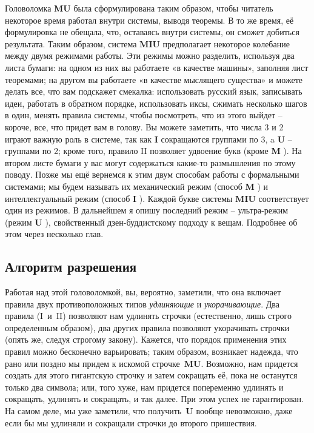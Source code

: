 \documentclass[../main.tex]{subfiles}
\begin{document}
Головоломка \textbf{MU} была сформулирована таким образом, чтобы читатель некоторое время работал внутри системы, выводя теоремы. В то же время, её формулировка не обещала, что, оставаясь внутри системы, он сможет добиться результата. Таким образом, система \textbf{MIU} предполагает некоторое колебание между двумя режимами работы. Эти режимы можно разделить, используя два листа бумаги: на одном из них вы работаете «в качестве машины», заполняя лист теоремами; на другом вы работаете «в качестве мыслящего существа» и можете делать все, что вам подскажет смекалка: использовать русский язык, записывать идеи, работать в обратном порядке, использовать иксы, сжимать несколько шагов в один, менять правила системы, чтобы посмотреть, что из этого выйдет \--- короче, все, что придет вам в голову. Вы можете заметить, что числа 3 и 2 играют важную роль в системе, так как \textbf{I} сокращаются группами по 3, a \textbf{U} \--- группами по 2; кроме того, правило II позволяет удвоение букв (кроме \textbf{M} ). На втором листе бумаги у вас могут содержаться какие-то размышления по этому поводу. Позже мы ещё вернемся к этим двум способам работы с формальными системами; мы будем называть их механический режим (способ \textbf{M} ) и интеллектуальный режим (способ \textbf{I} ). Каждой букве системы \textbf{MIU} соответствует один из режимов. В дальнейшем я опишу последний режим \--- ультра-режим (режим \textbf{U} ), свойственный дзен-буддистскому подходу к вещам. Подробнее об этом через несколько глав.


\subsection{Алгоритм разрешения}

Работая над этой головоломкой, вы, вероятно, заметили, что она включает правила двух противоположных типов \emph{удлиняющие} и \emph{укорачивающие}. Два правила (I~и~II) позволяют нам удлинять строчки (естественно, лишь строго определенным образом), два других правила позволяют укорачивать строчки (опять же, следуя строгому закону). Кажется, что порядок применения этих правил можно бесконечно варьировать; таким образом, возникает надежда, что рано или поздно мы придем к искомой строчке~\textbf{MU}. Возможно, нам придется создать для этого гигантскую строчку и затем сокращать её, пока не останутся только два символа; или, того хуже, нам придется попеременно удлинять и сокращать, удлинять и сокращать, и так далее. При этом успех не гарантирован. На самом деле, мы уже заметили, что получить~\textbf{U} вообще невозможно, даже если бы мы удлиняли и сокращали строчки до второго пришествия.
\end{document}
